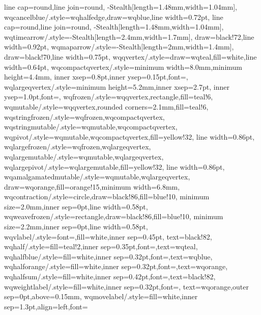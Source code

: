 {{   line cap=round,line join=round,
   -{Stealth[length=1.48mm,width=1.04mm]}},
 wqcancelblue/.style={wqhalfedge,draw=wqblue,line width=0.72pt,
   line cap=round,line join=round,
   -{Stealth[length=1.48mm,width=1.04mm]}},
 wqtimearrow/.style={-{Stealth[length=2.4mm,width=1.7mm]},
   draw=black!72,line width=0.92pt},
 wqmaparrow/.style={-{Stealth[length=2mm,width=1.4mm]},
   draw=black!70,line width=0.75pt},
 wqqvertex/.style={draw=wqteal,fill=white,line width=0.64pt},
 wqcompactqvertex/.style={minimum width=8.0mm,minimum height=4.4mm,
   inner xsep=0.8pt,inner ysep=0.15pt,font=\tiny},
 wqlargeqvertex/.style={minimum height=5.2mm,inner xsep=2.7pt,
   inner ysep=1.0pt,font=\scriptsize},
 wqfrozen/.style={wqqvertex,rectangle,fill=teal!6},
 wqmutable/.style={wqqvertex,rounded corners=2.1mm,fill=teal!6},
 wqstringfrozen/.style={wqfrozen,wqcompactqvertex},
 wqstringmutable/.style={wqmutable,wqcompactqvertex},
 wqpivot/.style={wqmutable,wqcompactqvertex,fill=yellow!32,
   line width=0.86pt},
 wqlargefrozen/.style={wqfrozen,wqlargeqvertex},
 wqlargemutable/.style={wqmutable,wqlargeqvertex},
 wqlargepivot/.style={wqlargemutable,fill=yellow!32,
   line width=0.86pt},
 wqamalgamatedmutable/.style={wqmutable,wqlargeqvertex,
   draw=wqorange,fill=orange!15,minimum width=6.8mm},
 wqcontraction/.style={circle,draw=black!86,fill=blue!10,
   minimum size=2.0mm,inner sep=0pt,line width=0.58pt},
 wqweavefrozen/.style={rectangle,draw=black!86,fill=blue!10,
   minimum size=2.2mm,inner sep=0pt,line width=0.58pt},
 wqvlabel/.style={font=\scriptsize,fill=white,inner sep=0.45pt,
   text=black!82},
 wqhalf/.style={fill=teal!2,inner sep=0.35pt,font=\tiny,text=wqteal},
 wqhalfblue/.style={fill=white,inner sep=0.32pt,font=\tiny,text=wqblue},
 wqhalforange/.style={fill=white,inner sep=0.32pt,font=\tiny,text=wqorange},
 wqhalfsum/.style={fill=white,inner sep=0.42pt,font=\tiny,text=black!82},
 wqweightlabel/.style={fill=white,inner sep=0.32pt,font=\tiny,
   text=wqorange,outer sep=0pt,above=0.15mm},
 wqmovelabel/.style={fill=white,inner sep=1.3pt,align=left,font=\scriptsize}
}

